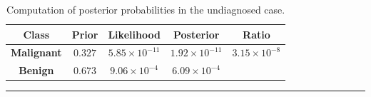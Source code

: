 \begin{enumerate}[noitemsep]
    \begin{table}[!t]
        \centering
        \begin{tabular}{c c c c c}
        \hline
        \textbf{Class} & \textbf{Prior} & \textbf{Likelihood} & \textbf{Posterior} & \textbf{Ratio}\\
        \hline
            \textbf{Malignant} & $0.327$ & $5.85\times 10^{-11}$ & $1.92\times 10^{-11}$ & $3.15 \times 10^{-8}$\\
        \textbf{Benign} & $0.673$ & $9.06\times 10^{-4}$ & $6.09\times 10^{-4}$ \\

        \hline
        \end{tabular}
        \caption[\small Computation of posterior probabilities in the undiagnosed case]{Computation of posterior probabilities in the undiagnosed case.}
        \label{tab:SA9}\hrule
     \end{table}    
        
\end{enumerate}




